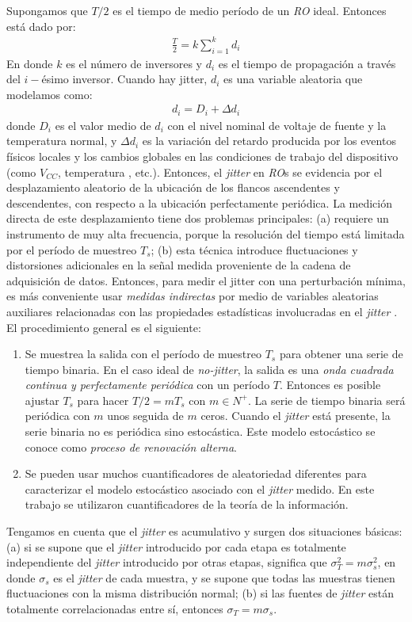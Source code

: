 Supongamos que $T/2$ es el tiempo de medio período de un \emph{RO} ideal.
Entonces está dado por:
%
\begin{eqnarray}
\frac{T}{2}=k \sum_{i=1}^{k}d_i
\end{eqnarray}
%
En donde $k$ es el número de inversores y $d_i$ es el tiempo de propagación a través del $i-$ésimo inversor.
Cuando hay jitter, $d_i$ es una variable aleatoria que modelamos como:
%
\begin{eqnarray}
d_i=D_i+ \Delta d_i
\end{eqnarray}
%
donde $D_i$ es el valor medio de $d_i$ con el nivel nominal de voltaje de fuente y la temperatura normal, y $\Delta d_i$ es la variación del retardo producida por los eventos físicos locales y los cambios globales en las condiciones de trabajo del dispositivo (como $V_{CC}$, temperatura , etc.).
Entonces, el \textit{jitter} en \emph{RO}s se evidencia por el desplazamiento aleatorio de la ubicación de los flancos ascendentes y descendentes, con respecto a la ubicación perfectamente periódica.
La medición directa de este desplazamiento tiene dos problemas principales:
(a) requiere un instrumento de muy alta frecuencia, porque la resolución del tiempo está limitada por el período de muestreo $T_s$;
(b) esta técnica introduce fluctuaciones y distorsiones adicionales en la señal medida proveniente de la cadena de adquisición de datos.
Entonces, para medir el jitter con una perturbación mínima, es más conveniente usar \emph{medidas indirectas} por medio de variables aleatorias auxiliares relacionadas con las propiedades estadísticas involucradas en el \textit{jitter} \cite{Lubicz2014}.
El procedimiento general es el siguiente:
\begin{enumerate}
\item Se muestrea la salida con el período de muestreo $ T_s $ para obtener una serie de tiempo binaria.
En el caso ideal de \emph{no-jitter}, la salida es una \emph{onda cuadrada continua y perfectamente periódica} con un período $T$.
Entonces es posible ajustar $T_s$ para hacer $T/2 = mT_s $ con $m \in N^+$.
La serie de tiempo binaria será periódica con $m$ unos seguida de $m$ ceros.
Cuando el \textit{jitter} está presente, la serie binaria no es periódica sino estocástica.
Este modelo estocástico se conoce como \emph{proceso de renovación alterna}.
\item Se pueden usar muchos cuantificadores de aleatoriedad diferentes para caracterizar el modelo estocástico asociado con el \textit{jitter} medido.
En este trabajo se utilizaron cuantificadores de la teoría de la información.
\end{enumerate}
Tengamos en cuenta que el \textit{jitter} es acumulativo y surgen dos situaciones básicas:
(a) si se supone que el \textit{jitter} introducido por cada etapa es totalmente independiente del \textit{jitter} introducido por otras etapas, significa que  $\sigma_T^2=m\sigma_s^2$, en donde $\sigma_s$ es el \textit{jitter} de cada muestra, y se supone que todas las muestras tienen fluctuaciones con la misma distribución normal;
(b) si las fuentes de \textit{jitter} están totalmente correlacionadas entre sí, entonces $\sigma_T=m\sigma_s$.